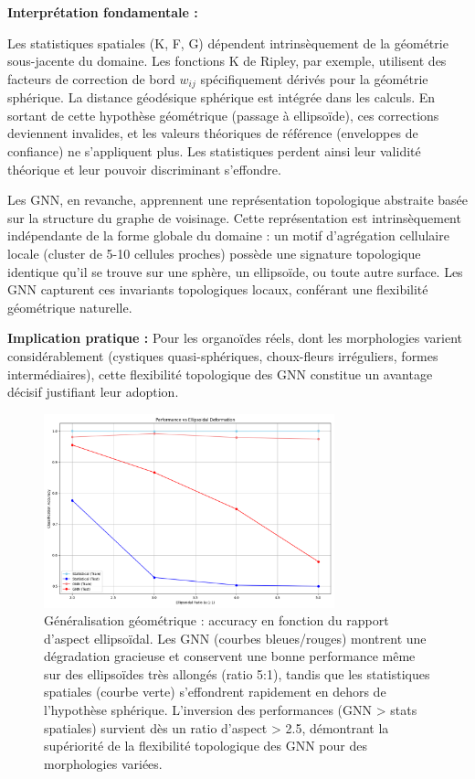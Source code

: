 \textbf{Interprétation fondamentale :}

Les statistiques spatiales (K, F, G) dépendent intrinsèquement de la géométrie sous-jacente du domaine. Les fonctions K de Ripley, par exemple, utilisent des facteurs de correction de bord $w_{ij}$ spécifiquement dérivés pour la géométrie sphérique. La distance géodésique sphérique est intégrée dans les calculs. En sortant de cette hypothèse géométrique (passage à ellipsoïde), ces corrections deviennent invalides, et les valeurs théoriques de référence (enveloppes de confiance) ne s'appliquent plus. Les statistiques perdent ainsi leur validité théorique et leur pouvoir discriminant s'effondre.

Les GNN, en revanche, apprennent une représentation topologique abstraite basée sur la structure du graphe de voisinage. Cette représentation est intrinsèquement indépendante de la forme globale du domaine : un motif d'agrégation cellulaire locale (cluster de 5-10 cellules proches) possède une signature topologique identique qu'il se trouve sur une sphère, un ellipsoïde, ou toute autre surface. Les GNN capturent ces invariants topologiques locaux, conférant une flexibilité géométrique naturelle.

\textbf{Implication pratique :} Pour les organoïdes réels, dont les morphologies varient considérablement (cystiques quasi-sphériques, choux-fleurs irréguliers, formes intermédiaires), cette flexibilité topologique des GNN constitue un avantage décisif justifiant leur adoption.

\begin{figure}[htbp]
    \centering
    \includegraphics[width=0.75\textwidth]{../img/accuracy_vs_ratio.png}
    \caption{Généralisation géométrique : accuracy en fonction du rapport d'aspect ellipsoïdal. Les GNN (courbes bleues/rouges) montrent une dégradation gracieuse et conservent une bonne performance même sur des ellipsoïdes très allongés (ratio 5:1), tandis que les statistiques spatiales (courbe verte) s'effondrent rapidement en dehors de l'hypothèse sphérique. L'inversion des performances (GNN > stats spatiales) survient dès un ratio d'aspect > 2.5, démontrant la supériorité de la flexibilité topologique des GNN pour des morphologies variées.}
    \label{fig:ratio_aspect}
\end{figure}

